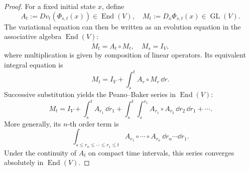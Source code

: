 \documentclass[12pt,a4paper,oneside]{book}
\begin{document}
\begin{proof}
For a fixed initial state $x$, define
\begin{equation*}
    A_t:=Dv_t(\Phi_{s,t}(x))\in\operatorname{End}(V), \quad
    M_t:=D_x\Phi_{s,t}(x)\in\operatorname{GL}(V).
\end{equation*}
The variational equation can then be written as an evolution equation in the associative algebra $\operatorname{End}(V)$:
\begin{equation*}
    \dot M_t=A_t\circ M_t, \quad M_s=I_V,
\end{equation*}
where multiplication is given by composition of linear operators. Its equivalent integral equation is
\begin{equation*}
    M_t=I_V+\int_s^t A_r\circ M_r\,\dd r.
\end{equation*}
Successive substitution yields the Peano--Baker series in $\operatorname{End}(V)$:
\begin{equation*}
    M_t = I_V+\int_s^t A_{r_1}\,\dd r_1 + \int_s^t\int_s^{r_1} A_{r_1}\circ A_{r_2}\,\dd r_2\,\dd r_1 + \cdots.
\end{equation*}
More generally, its $n$-th order term is
\begin{equation*}
    \int_{s\leq r_n\leq\cdots\leq r_1\leq t} A_{r_1}\circ\cdots\circ A_{r_n}\,\dd r_n\cdots\dd r_1.
\end{equation*}
Under the continuity of $A_t$ on compact time intervals, this series converges absolutely in $\operatorname{End}(V)$.


\end{proof}
\end{document}
